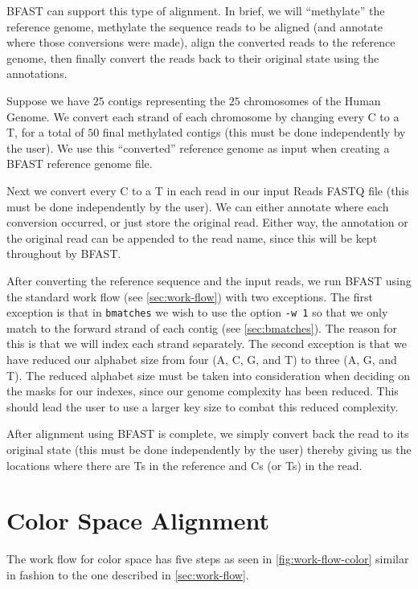 \documentclass[a4paper,12pt]{book}
\newcommand{\TT}[1]{{\tt #1}} %
\newcommand{\RFF}{Reads FASTQ file}
\newcommand{\BRGF}{BFAST reference genome file} %
\begin{document}
BFAST can support this type of alignment.
In brief, we will ``methylate'' the reference genome, methylate the sequence reads to be aligned (and annotate where those conversions were made), align the converted reads to the reference genome, then finally convert the reads back to their original state using the annotations.

Suppose we have $25$ contigs representing the $25$ chromosomes of the Human Genome.
We convert each strand of each chromosome by changing every C to a T, for a total of $50$ final methylated contigs (this must be done independently by the user). 
We use this ``converted'' reference genome as input when creating a \BRGF{}.

Next we convert every C to a T in each read in our input \RFF{} (this must be done independently by the user). 
We can either annotate where each conversion occurred, or just store the original read.
Either way, the annotation or the original read can be appended to the read name, since this will be kept throughout by BFAST.

After converting the reference sequence and the input reads, we run BFAST using the standard work flow (see \autoref{sec:work-flow}) with two exceptions.
The first exception is that in \TT{bmatches} we wish to use the option \TT{-w 1} so that we only match to the forward strand of each contig (see \autoref{sec:bmatches}).
The reason for this is that we will index each strand separately.
The second exception is that we have reduced our alphabet size from four (A, C, G, and T) to three (A, G, and T).
The reduced alphabet size must be taken into consideration when deciding on the masks for our indexes, since our genome complexity has been reduced.
This should lead the user to use a larger key size to combat this reduced complexity.

After alignment using BFAST is complete, we simply convert back the read to its original state (this must be done independently by the user) thereby giving us the locations where there are Ts in the reference and Cs (or Ts) in the read.


\section{Color Space Alignment}
\label{sec:color-space-alignment}
The work flow for color space has five steps as seen in \autoref{fig:work-flow-color} similar in fashion to the one described in \autoref{sec:work-flow}.
\end{document}
